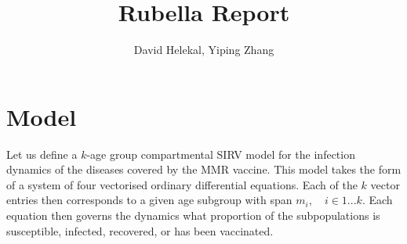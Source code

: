 \documentclass{article}
\title{Rubella Report}
\author{David Helekal, Yiping Zhang}
\begin{document}
\maketitle
\section{Model}

Let us define a $k$-age group compartmental SIRV model for the infection dynamics of the diseases covered by the MMR vaccine. This model takes the form of a system of four vectorised ordinary differential equations. Each of the $k$ vector entries then corresponds to a given age subgroup with span $m_i, \quad i\in1...k$. Each equation then governs the dynamics what proportion of the subpopulations is susceptible, infected, recovered, or has been vaccinated.
\end{document}
